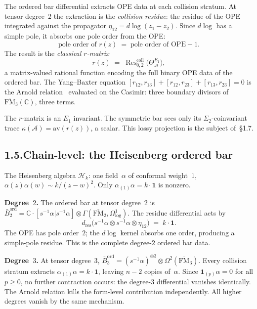 \documentclass[11pt,reqno]{amsart}
\makeatletter
\theoremstyle{definition}
\theoremstyle{remark}
\providecommand{\cA}{\mathcal{A}}
\providecommand{\cH}{\mathcal{H}}
\providecommand{\barB}{\bar{B}}
\providecommand{\bC}{\mathbb{C}}
\numberwithin{equation}{section}
\let\svy@oldeqref\eqref
\renewcommand{\eqref}[1]{%
 \@ifundefined{r@#1}{(\textit{full monograph})}{\svy@oldeqref{#1}}%
}
\makeatother
\begin{document}
The ordered bar differential extracts OPE data at each collision
stratum. At tensor degree~$2$ the extraction is the \emph{collision
residue}: the residue of the OPE integrated against the propagator
$\eta_{12}=d\log(z_1-z_2)$. Since $d\log$ has a simple pole, it
absorbs one pole order from the OPE:
\begin{equation}\label{eq:pole-absorption}
\text{pole order of }r(z) \;=\; \text{pole order of OPE} - 1.
\end{equation}
The result is the \emph{classical $r$-matrix}
\[
r(z)\;=\;\operatorname{Res}^{\mathrm{coll}}_{0,2}
\bigl(\Theta^{E_1}_{\cA}\bigr),
\]
a matrix-valued rational function encoding the full binary OPE data
of the ordered bar. The Yang--Baxter equation
$[r_{12},r_{13}]+[r_{12},r_{23}]+[r_{13},r_{23}]=0$ is the
Arnold relation~\eqref{eq:preface-arnold} evaluated on the
Casimir: three boundary divisors of $\overline{\mathrm{FM}}_3(\bC)$,
three terms.

The $r$-matrix is an $E_1$ invariant. The symmetric bar sees only
its $\Sigma_2$-coinvariant trace $\kappa(\cA)=\mathrm{av}(r(z))$,
a scalar. This lossy projection is the subject of~\S1.7.

\subsection*{1.5.\enspace Chain-level: the Heisenberg ordered bar}

The Heisenberg algebra $\cH_k$: one field~$\alpha$ of conformal
weight~$1$, $\alpha(z)\alpha(w)\sim k/(z-w)^2$. Only
$\alpha_{(1)}\alpha=k\cdot\mathbf 1$ is nonzero.

\medskip
\noindent\textbf{Degree~$2$.}\enspace
The ordered bar at tensor degree~$2$ is
$\barB^{\mathrm{ord}}_2=\bC\cdot[s^{-1}\alpha|s^{-1}\alpha]
\otimes\Gamma(\overline{\mathrm{FM}}_2,\Omega^1_{\log})$.
The residue differential acts by
\[
d_{\mathrm{res}}
\bigl(s^{-1}\alpha\otimes s^{-1}\alpha\otimes\eta_{12}\bigr)
\;=\;k\cdot\mathbf{1}.
\]
The OPE has pole order~$2$; the $d\log$ kernel absorbs one order,
producing a simple-pole residue. This is the complete degree-$2$
ordered bar data.

\medskip
\noindent\textbf{Degree~$3$.}\enspace
At tensor degree~$3$,
$\barB^{\mathrm{ord}}_3=(s^{-1}\alpha)^{\otimes 3}
\otimes\Omega^2(\overline{\mathrm{FM}}_3)$.
Every collision stratum extracts
$\alpha_{(1)}\alpha=k\cdot\mathbf{1}$, leaving $n-2$ copies
of~$\alpha$. Since $\mathbf{1}_{(p)}\alpha=0$ for all $p\ge 0$,
no further contraction occurs: the degree-$3$ differential
vanishes identically. The Arnold relation kills the form-level
contribution independently. All higher degrees vanish by the same
mechanism.
\end{document}
